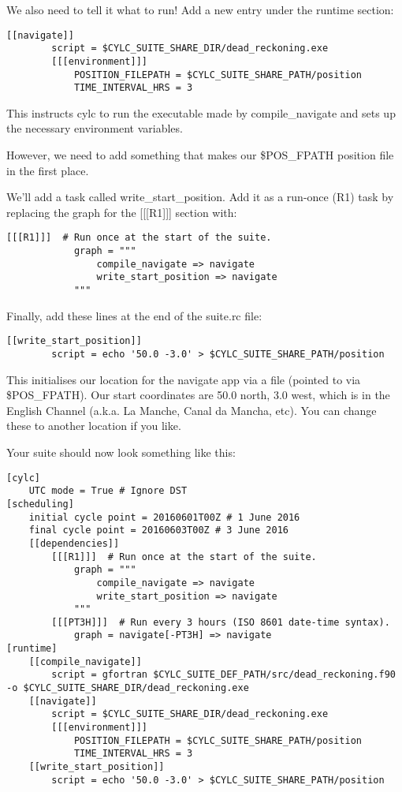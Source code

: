 We also need to tell it what to run! Add a new entry under the runtime section:

\lstset{language=suiterc}
\begin{lstlisting}[columns=fullflexible]
    [[navigate]]
        script = $CYLC_SUITE_SHARE_DIR/dead_reckoning.exe
        [[[environment]]]
            POSITION_FILEPATH = $CYLC_SUITE_SHARE_PATH/position
            TIME_INTERVAL_HRS = 3
\end{lstlisting}

This instructs cylc to run the executable made by compile\_navigate and sets up the necessary environment variables.

However, we need to add something that makes our \$POS\_FPATH position file in the first place.

We'll add a task called write\_start\_position. Add it as a run-once (R1) task by replacing the graph for the [[[R1]]] section with:

\lstset{language=suiterc}
\begin{lstlisting}[columns=fullflexible]
        [[[R1]]]  # Run once at the start of the suite.
            graph = """
                compile_navigate => navigate
                write_start_position => navigate
            """
\end{lstlisting}

Finally, add these lines at the end of the suite.rc file:

\lstset{language=suiterc}
\begin{lstlisting}[columns=fullflexible]
    [[write_start_position]]
        script = echo '50.0 -3.0' > $CYLC_SUITE_SHARE_PATH/position
\end{lstlisting}

This initialises our location for the navigate app via a file (pointed to via \$POS\_FPATH). Our start coordinates are 50.0 north, 3.0 west, which is in the English Channel (a.k.a. La Manche, Canal da Mancha, etc). You can change these to another location if you like.

Your suite should now look something like this:

\lstset{language=suiterc}
\begin{lstlisting}[columns=fullflexible]
[cylc]
    UTC mode = True # Ignore DST
[scheduling]
    initial cycle point = 20160601T00Z # 1 June 2016
    final cycle point = 20160603T00Z # 3 June 2016
    [[dependencies]]
        [[[R1]]]  # Run once at the start of the suite.
            graph = """
                compile_navigate => navigate
                write_start_position => navigate
            """
        [[[PT3H]]]  # Run every 3 hours (ISO 8601 date-time syntax).
            graph = navigate[-PT3H] => navigate
[runtime]
    [[compile_navigate]]
        script = gfortran $CYLC_SUITE_DEF_PATH/src/dead_reckoning.f90 -o $CYLC_SUITE_SHARE_DIR/dead_reckoning.exe
    [[navigate]]
        script = $CYLC_SUITE_SHARE_DIR/dead_reckoning.exe
        [[[environment]]]
            POSITION_FILEPATH = $CYLC_SUITE_SHARE_PATH/position
            TIME_INTERVAL_HRS = 3
    [[write_start_position]]
        script = echo '50.0 -3.0' > $CYLC_SUITE_SHARE_PATH/position
\end{lstlisting}

